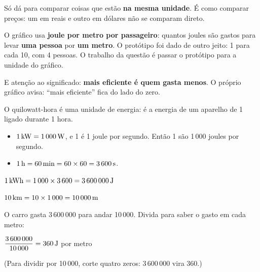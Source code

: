 \begin{enunciado}

\end{enunciado}


\begin{ideia}
Só dá para comparar coisas que estão \textbf{na mesma unidade}. É como comparar preços: um em reais e outro em dólares não se
comparam direto.

O gráfico usa \textbf{joule por metro por passageiro}: quantos joules são gastos para levar \textbf{uma pessoa} por
\textbf{um metro}. O protótipo foi dado de outro jeito: 1 para cada 10, com 4 pessoas.
O trabalho da questão é passar o protótipo para a unidade do gráfico.

E atenção ao significado: \textbf{mais eficiente é quem gasta menos}. O próprio gráfico avisa: ``mais eficiente'' fica do
lado do zero.
\end{ideia}

\passoapasso
{}
O quilowatt-hora é uma unidade de energia: é a energia de um aparelho de 1 ligado durante 1 hora.
\begin{itemize}
  \item $1\,\text{kW} = 1\,000\,\text{W}$, e 1 é 1 joule por segundo. Então 1 são 1\,000 joules por segundo.
  \item $1\,\text{h} = 60\,\text{min} = 60 \times 60 = 3\,600\,\text{s}$.
\end{itemize}
\begin{conta}
$1\,\text{kWh} = 1\,000 \times 3\,600 = 3\,600\,000\,\text{J}$
\end{conta}

\begin{conta}
$10\,\text{km} = 10 \times 1\,000 = 10\,000\,\text{m}$
\end{conta}

O carro gasta 3\,600\,000 para andar 10\,000. Divida para saber o gasto em cada metro:
\begin{conta}
$\dfrac{3\,600\,000}{10\,000} = 360\,\text{J}$ por metro
\end{conta}
(Para dividir por 10\,000, corte quatro zeros: 3\,600\,000 vira 360.)

